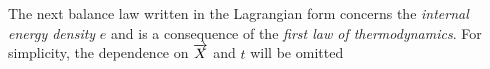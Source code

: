 The next balance law written in the Lagrangian form concerns the \textit{internal energy density} $e$ and is a consequence of the \textit{first law of thermodynamics}. For simplicity, the dependence on ${\overrightarrow{X}}$ and $t$ will be omitted


